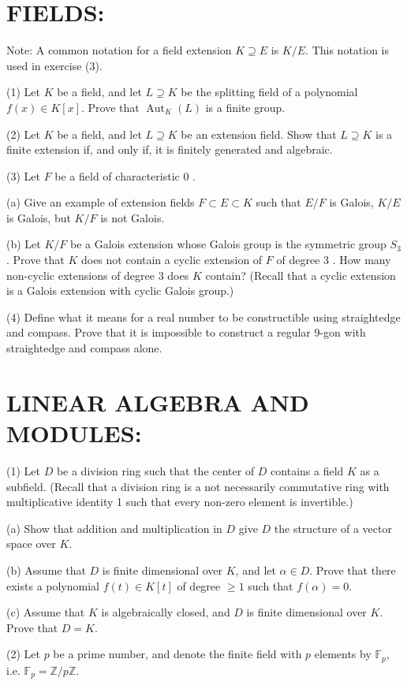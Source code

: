 \documentclass[10pt]{article}
\begin{document}
\section{FIELDS:}
Note: A common notation for a field extension $K \supseteq E$ is $K / E$. This notation is used in exercise (3).

(1) Let $K$ be a field, and let $L \supseteq K$ be the splitting field of a polynomial $f(x) \in K[x]$. Prove that $\operatorname{Aut}_{K}(L)$ is a finite group.

(2) Let $K$ be a field, and let $L \supseteq K$ be an extension field. Show that $L \supseteq K$ is a finite extension if, and only if, it is finitely generated and algebraic.

(3) Let $F$ be a field of characteristic 0 .

(a) Give an example of extension fields $F \subset E \subset K$ such that $E / F$ is Galois, $K / E$ is Galois, but $K / F$ is not Galois.

(b) Let $K / F$ be a Galois extension whose Galois group is the symmetric group $S_{3}$. Prove that $K$ does not contain a cyclic extension of $F$ of degree 3 . How many non-cyclic extensions of degree 3 does $K$ contain? (Recall that a cyclic extension is a Galois extension with cyclic Galois group.)

(4) Define what it means for a real number to be constructible using straightedge and compass. Prove that it is impossible to construct a regular 9-gon with straightedge and compass alone.

\section{LINEAR ALGEBRA AND MODULES:}
(1) Let $D$ be a division ring such that the center of $D$ contains a field $K$ as a subfield. (Recall that a division ring is a not necessarily commutative ring with multiplicative identity 1 such that every non-zero element is invertible.)

(a) Show that addition and multiplication in $D$ give $D$ the structure of a vector space over $K$.

(b) Assume that $D$ is finite dimensional over $K$, and let $\alpha \in D$. Prove that there exists a polynomial $f(t) \in K[t]$ of degree $\geq 1$ such that $f(\alpha)=0 .$

(c) Assume that $K$ is algebraically closed, and $D$ is finite dimensional over $K$. Prove that $D=K$.

(2) Let $p$ be a prime number, and denote the finite field with $p$ elements by $\mathbb{F}_{p}$, i.e. $\mathbb{F}_{p}=\mathbb{Z} / p \mathbb{Z}$.
\end{document}
